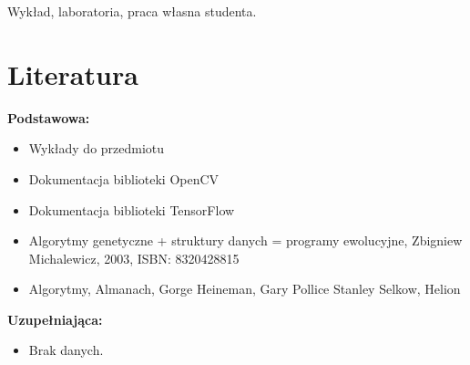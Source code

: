 \documentclass[12pt, a4paper]{article}
\begin{document}
Wykład, laboratoria, praca własna studenta.

\section{Literatura}

\textbf{Podstawowa:}
\begin{itemize}
  \item Wykłady do przedmiotu
  \item Dokumentacja biblioteki OpenCV
  \item Dokumentacja biblioteki TensorFlow
  \item Algorytmy genetyczne + struktury danych = programy ewolucyjne, Zbigniew Michalewicz, 2003, ISBN: 8320428815
  \item Algorytmy, Almanach, Gorge Heineman, Gary Pollice Stanley Selkow, Helion
\end{itemize}

\textbf{Uzupełniająca:}
\begin{itemize}
  \item Brak danych.
\end{itemize}
\end{document}
